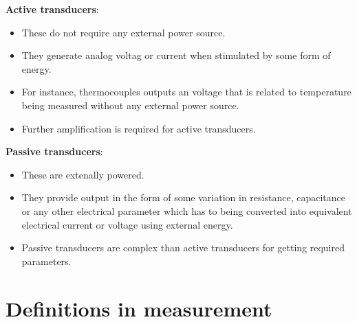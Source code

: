 \documentclass{article}
\begin{document}
\begin{itemize}
		\textbf{Active transducers}: 
		\begin{itemize}
			\item These do not require any external power source. 
			\item They generate analog voltag or current when stimulated by some form of energy. 
			\item For instance, thermocouples outputs an voltage that is related to temperature being measured without any external power source. 
			\item Further amplification is required for active transducers.
		\end{itemize}
		\textbf{Passive transducers}:
		\begin{itemize}
			\item These are extenally powered.
			\item They provide output in the form of some variation in resistance, capacitance or any other electrical parameter which has to being converted into equivalent electrical current or voltage using external energy. 
			\item Passive transducers are complex than active transducers for getting required parameters. 
		\end{itemize}

	\end{itemize}

\section{Definitions in measurement}
\end{document}
